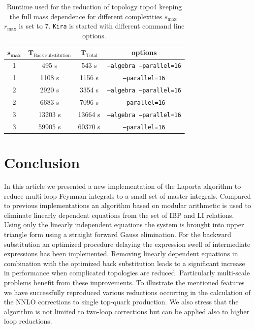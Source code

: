 \documentclass[a4paper,12pt]{scrartcl}
\newcommand*{\mr}{\mathrm}
\newcommand*{\bm}{\boldsymbol}
\newcommand*{\kira}{\texttt{Kira}}
\begin{document}
\begin{table}[htpb]
  \caption{
    Runtime used for the reduction of
    topology topo4 keeping the full mass dependence for
    different
    complexities $s_{\max}$. $r_{\max}$ is set to 7.
    \kira{} is started with different command line options.
    }
  \label{tab:--algebra-impact}\renewcommand{\arraystretch}{1.3}
  \begin{center}
  \begin{tabular}[\linewidth]{cccc}
    \hline
    $\bm{s_{\max}}$& $\bm{T_{\mr{Back\;substitution}}}$ &
    $\bm{T_{\mr{Total}}}$ & \textbf{options} \\
    \hline
      1 & 495 s   & 543 s   & \texttt{--algebra --parallel=16}  \\
      1 & 1108 s  & 1156 s  & \texttt{--parallel=16}   \\\hline
      2 & 2920 s  & 3354 s  & \texttt{--algebra --parallel=16}  \\
      2 & 6683 s  & 7096 s  & \texttt{--parallel=16}   \\\hline
      3 & 13203 s & 13664 s & \texttt{--algebra --parallel=16}  \\
      3 & 59905 s & 60370 s & \texttt{--parallel=16}  \\\hline
  \end{tabular}
  \end{center}
\end{table}

\section{Conclusion}
\label{summary}
In this article we presented a new implementation of the Laporta algorithm to
reduce multi-loop Feynman integrals to a small set of master
integrals. Compared to previous implementations an algorithm based on
modular arithmetic is used to eliminate linearly dependent
equations from the set of IBP and LI relations. Using only the
linearly independent equations the system is brought into upper triangle
form using a straight forward Gauss elimination. For the backward substitution
an optimized procedure
delaying the expression swell of intermediate expressions has been
implemented.  Removing linearly dependent equations in combination
with the optimized back substitution leads to a significant increase
in performance when complicated topologies are reduced. Particularly
multi-scale problems benefit from these improvements. To illustrate
the mentioned features we have successfully reproduced various
reductions occurring in the calculation of the NNLO corrections to
single top-quark production. We also stress that the algorithm is not
limited to two-loop corrections but can be applied also to higher loop
reductions.
\end{document}
